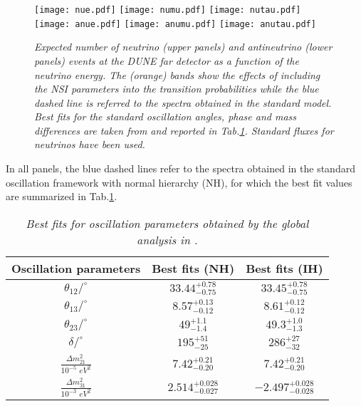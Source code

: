 \documentclass[12pt]{article}
\begin{document}
\begin{figure}
    \centering
    \texttt{[image: nue.pdf]}
    \texttt{[image: numu.pdf]}
    \texttt{[image: nutau.pdf]}
    \texttt{[image: anue.pdf]}
    \texttt{[image: anumu.pdf]}
    \texttt{[image: anutau.pdf]}
    \caption{\it Expected number of neutrino (upper panels) and antineutrino (lower panels) events at the DUNE far detector as a function of the neutrino energy. The (orange) bands show the effects of including the NSI parameters into the transition probabilities while the blue dashed line is referred to the spectra obtained in the standard model. Best fits for the standard oscillation angles, phase and mass differences are taken from \cite{Esteban:2020cvm} and reported in Tab.\ref{SMparam}. Standard fluxes for neutrinos have been used.} 
    \label{NSIspectra}
\end{figure}
In all panels, the blue dashed lines refer to the spectra obtained in the standard oscillation framework with normal hierarchy (NH), for which the  best fit values are summarized in Tab.\ref{SMparam}.
\begin{table}[]
\centering
\renewcommand{\arraystretch}{1.6}
\begin{tabular}{|c|c|c|}
\hline
\textbf{Oscillation parameters}              & \textbf{Best fits (NH)}   & \textbf{Best fits (IH)}    \\ \hline
$\theta_{12}/^\circ$                         & $33.44^{+0.78}_{-0.75}$   & $33.45^{+0.78}_{-0.75}$    \\ \hline
$\theta_{13}/^\circ$                         & $8.57^{+0.13}_{-0.12}$    & $8.61^{+0.12}_{-0.12}$     \\ \hline
$\theta_{23}/^\circ$                         & $49^{+1.1}_{-1.4}$        & $49.3^{+1.0}_{-1.3}$       \\ \hline
$\delta/^\circ$                              & $195^{+51}_{-25}$         & $286^{+27}_{-32}$          \\ \hline
$\frac{\Delta m_{21}^2}{10^{-5} \, \, eV^2}$ & $7.42^{+0.21}_{-0.20}$    & $7.42^{+0.21}_{-0.20}$     \\ \hline
$\frac{\Delta m_{31}^2}{10^{-3} \, \, eV^2}$ & $2.514^{+0.028}_{-0.027}$ & $-2.497^{+0.028}_{-0.028}$ \\ \hline
\end{tabular}
\caption{\label{SMparam}\it Best fits for oscillation parameters obtained by the global analysis in \cite{Esteban:2020cvm}.}
\end{table}
\end{document}
